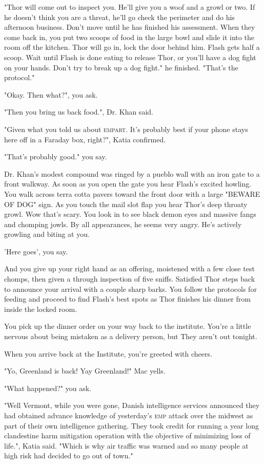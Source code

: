 \documentclass[a5paper, symmetric]{tufte-book}
\begin{document}
"Thor will come out to inspect you. He'll give you a woof and a growl or two. If he doesn't think you are a threat, he'll go check the perimeter and do his afternoon business. Don't move until he has finished his assessment. When they come back in, you put two scoops of food in the large bowl and slide it into the room off the kitchen. Thor will go in, lock the door behind him.  Flash gets half a scoop. Wait until Flash is done eating to release Thor, or you'll have a dog fight on your hands. Don't try to break up a dog fight." he finished. "That's the protocol."

"Okay. Then what?", you ask.

"Then you bring us back food.", Dr. Khan said. 

"Given what you told us about \textsc{empart}. It's probably best if your phone stays here off in a Faraday box, right?", Katia confirmed.

"That's probably good." you say.

Dr. Khan's modest compound was ringed by a pueblo wall with an iron gate to a front walkway. As soon as you open the gate you hear Flash's excited howling. You walk across terra cotta pavers toward the front door with a large "BEWARE OF DOG" sign. As you touch the mail slot flap you hear Thor's deep throaty growl. Wow that's scary. You look in to see black demon eyes and massive fangs and chomping jowls. By all appearances, he seems very angry. He's actively growling and biting at you. 

'Here goes', you say. 

And you give up your right hand as an offering, moistened with a few close test chomps, then given a through inspection of five sniffs. Satisfied Thor steps back to announce your arrival with a couple sharp barks. You follow the protocols for feeding and proceed to find Flash's best spots as Thor finishes his dinner from inside the locked room. 

You pick up the dinner order on your way back to the institute. You're a little nervous about being mistaken as a delivery person, but They aren't out tonight.

When you arrive back at the Institute, you're greeted with cheers. 

"Yo, Greenland is back! Yay Greenland!" Mac yells. 

"What happened?" you ask. 

"Well Vermont, while you were gone, Danish intelligence services announced they had obtained advance knowledge of yesterday's \textsc{emp} attack over the midwest as part of their own intelligence gathering. They took credit for running a year long clandestine harm mitigation operation with the objective of minimizing loss of life.", Katia said. "Which is why air traffic was warned and so many people at high risk had decided to go out of town."
\end{document}
